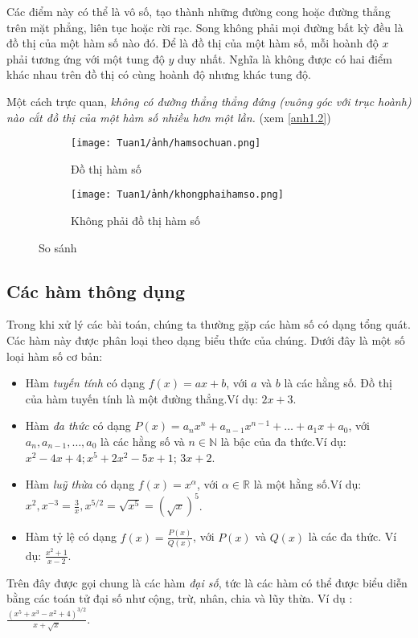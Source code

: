 Các điểm này có thể là vô số, tạo thành những đường cong hoặc đường thẳng trên mặt phẳng, liên tục hoặc rời rạc. Song không phải mọi đường bất kỳ đều là đồ thị của một hàm số nào đó. Để là đồ thị của một hàm số, mỗi hoành độ $x$ phải tương ứng với một tung độ $y$ duy nhất. Nghĩa là không được có hai điểm khác nhau trên đồ thị có cùng hoành độ nhưng khác tung độ.

Một cách trực quan,\emph{ không có đường thẳng thẳng đứng (vuông góc với trục hoành) nào cắt đồ thị của một hàm số nhiều hơn một lần.} (xem \ref{anh1.2})
\begin{figure}[htbp]
    \centering
    \begin{subfigure}{0.4\textwidth}
        \centering
        \texttt{[image: Tuan1/ảnh/hamsochuan.png]}
        \caption{Đồ thị hàm số}
    \end{subfigure}
    \hfill
    \begin{subfigure}{0.4\textwidth}
        \centering
        \texttt{[image: Tuan1/ảnh/khongphaihamso.png]}
        \caption{Không phải đồ thị hàm số}
    \end{subfigure}
    \caption{So sánh}\label{anh1.3}
    \end{figure}

\subsection{Các hàm thông dụng}

Trong khi xử lý các bài toán, chúng ta thường gặp các hàm số có dạng tổng quát. Các hàm này được phân loại theo dạng biểu thức của chúng. Dưới đây là một số loại hàm số cơ bản:   \begin{itemize}
    \item Hàm \emph{tuyến tính} có dạng $f(x) = ax + b$, với $a$ và $b$ là các hằng số. Đồ thị của hàm tuyến tính là một đường thẳng.\newline Ví dụ: $ 2x+3$.
    \item Hàm \emph{đa thức} có dạng $P(x) = a_n x^n + a_{n-1} x^{n-1} + \ldots + a_1 x + a_0$, với $a_n, a_{n-1}, \ldots, a_0$ là các hằng số và $n\in\mathbb{N}$ là bậc của đa thức.\newline Ví dụ: $x^2 - 4x + 4; x^5 + 2x^2 - 5x + 1$; $3x+2$.
    \item Hàm \emph{luỹ thừa} có dạng $f(x)=x^\alpha$, với $\alpha\in\mathbb{R}$ là một hằng số.\newline Ví dụ: $x^2, x^{-3}=\frac{3}{x}, x^{5/2}=\sqrt{x^5}=(\sqrt x)^5$.     
    \item Hàm tỷ lệ có dạng $f(x) = \frac{P(x)}{Q(x)}$, với $P(x)$ và $Q(x)$ là các đa thức. Ví dụ: $\frac{x^2+1}{x-2}$.    
\end{itemize}
Trên đây được gọi chung là các hàm \emph{đại số}, tức là các hàm có thể được biểu diễn bằng các toán tử đại số như cộng, trừ, nhân, chia và lũy thừa.\newline
Ví dụ : $\frac{\left(x^5+x^3-x^2+4\right)^{3/2}}{x+\sqrt x}$.
\vspace{8pt}

